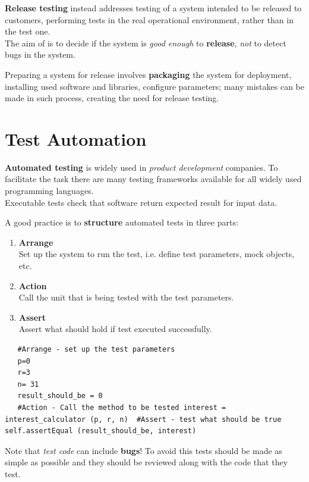 \textbf{Release testing} instead addresses testing of a system intended to be released to customers,
performing tests in the real operational environment, rather than
in the test one.\\
The aim of is to decide if the system is \textit{good enough} to \textbf{release}, \textit{not} to detect bugs in the system.

Preparing a system for release involves \textbf{packaging} the system for
deployment, installing used software and libraries, configure parameters;
many  mistakes can be made in such process, creating the need for release testing.

\section{Test Automation}
\textbf{Automated testing} is widely used in \textit{product development} companies.
To facilitate the task there are many testing frameworks available for all widely used programming languages.\\
Executable tests check that software return expected result for input data.

A good practice is to \textbf{structure} automated tests in three parts:
\begin{enumerate}
   \item \textbf{Arrange}\\
   Set up the system to run the test, i.e. define test parameters, mock objects, etc.
   \item \textbf{Action}\\
   Call the unit that is being tested with the test parameters.
   \item \textbf{Assert}\\
   Assert what should hold if test executed successfully.
\end{enumerate}

\begin{lstlisting}
   #Arrange - set up the test parameters
   p=0
   r=3
   n= 31
   result_should_be = 0
   #Action - Call the method to be tested interest = interest_calculator (p, r, n)  #Assert - test what should be true self.assertEqual (result_should_be, interest)
\end{lstlisting}

Note that \textit{test code} can include \textbf{bugs}!
To avoid this tests should be made as simple as possible and they should be reviewed along with the code that they test.

